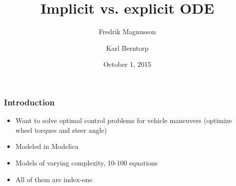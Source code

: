 \documentclass[]{beamer}
\title{Implicit vs. explicit ODE}
\author{Fredrik Magnusson\inst{1} \and Karl Berntorp\inst{2}}
\institute
{
\inst{1} Department of Automatic Control \\
Lund University, Sweden \\
\vspace{14pt}
\inst{2} Mitsubishi Electric Research Laboratories \\
Cambridge, MA \\
\vspace{14pt}
\insertdate
}
\date{October 1, 2015}
\begin{document}
{
\begin{frame}[noframenumbering]
    \titlepage
\end{frame}
}

\begin{frame}
\frametitle{Introduction}
\begin{itemize}
\item
Want to solve optimal control problems for vehicle maneuvers (optimize wheel torques and steer angle)
\item
Modeled in Modelica
\item
Models of varying complexity, 10-100 equations
\item
All of them are index-one
\end{itemize}
\end{frame}
\end{document}
